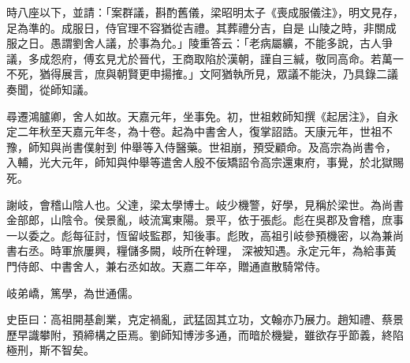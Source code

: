 \begin{pinyinscope}
 時八座以下，並請：「案群議，斟酌舊儀，梁昭明太子《喪成服儀注》，明文見存，足為準的。成服日，侍官理不容猶從吉禮。其葬禮分吉，自是
 山陵之時，非關成服之日。愚謂劉舍人議，於事為允。」陵重答云：「老病屬纊，不能多說，古人爭議，多成怨府，傅玄見尤於晉代，王商取陷於漢朝，謹自三緘，敬同高命。若萬一不死，猶得展言，庶與朝賢更申揚搉。」文阿猶執所見，眾議不能決，乃具錄二議奏聞，從師知議。



 尋遷鴻臚卿，舍人如故。天嘉元年，坐事免。初，世祖敕師知撰《起居注》，自永定二年秋至天嘉元年冬，為十卷。起為中書舍人，復掌詔誥。天康元年，世祖不豫，師知與尚書僕射到
 仲舉等入侍醫藥。世祖崩，預受顧命。及高宗為尚書令，入輔，光大元年，師知與仲舉等遣舍人殷不佞矯詔令高宗還東府，事覺，於北獄賜死。



 謝岐，會稽山陰人也。父達，梁太學博士。岐少機警，好學，見稱於梁世。為尚書金部郎，山陰令。侯景亂，岐流寓東陽。景平，依于張彪。彪在吳郡及會稽，庶事一以委之。彪每征討，恆留岐監郡，知後事。彪敗，高祖引岐參預機密，以為兼尚書右丞。時軍旅屢興，糧儲多闕，岐所在幹理，
 深被知遇。永定元年，為給事黃門侍郎、中書舍人，兼右丞如故。天嘉二年卒，贈通直散騎常侍。



 岐弟嶠，篤學，為世通儒。



 史臣曰：高祖開基創業，克定禍亂，武猛固其立功，文翰亦乃展力。趙知禮、蔡景歷早識攀附，預締構之臣焉。劉師知博涉多通，而暗於機變，雖欲存乎節義，終陷極刑，斯不智矣。



\end{pinyinscope}